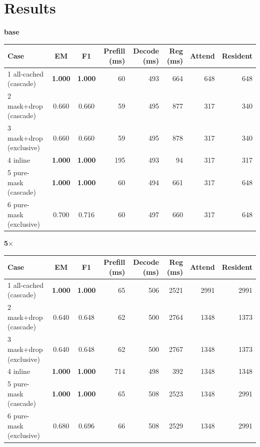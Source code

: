 \documentclass[11pt]{article}
\begin{document}
\section{Results}
\begin{table}[h]
\centering
\renewcommand{\arraystretch}{1.12}
\setlength{\tabcolsep}{5pt}
\textbf{base}\\[2pt]
\begin{tabular}{@{}l c c r r r r r@{}}
\toprule
Case & EM & F1 & Prefill (ms) & Decode (ms) & Reg (ms) & Attend & Resident \\
\midrule
1 all-cached (cascade)  & \textbf{1.000} & \textbf{1.000} & 60  & 493 & 664 & 648 & 648 \\
2 mask+drop (cascade)   & 0.660 & 0.660 & 59  & 495 & 877 & 317 & 340 \\
3 mask+drop (exclusive) & 0.660 & 0.660 & 59  & 495 & 878 & 317 & 340 \\
4 inline                & \textbf{1.000} & \textbf{1.000} & 195 & 493 & 94  & 317 & 317 \\
5 pure-mask (cascade)   & \textbf{1.000} & \textbf{1.000} & 60  & 494 & 661 & 317 & 648 \\
6 pure-mask (exclusive) & 0.700 & 0.716 & 60  & 497 & 660 & 317 & 648 \\
\bottomrule
\end{tabular}

\vspace{0.8em}
\textbf{5$\times$}\\[2pt]
\begin{tabular}{@{}l c c r r r r r@{}}
\toprule
Case & EM & F1 & Prefill (ms) & Decode (ms) & Reg (ms) & Attend & Resident \\
\midrule
1 all-cached (cascade)  & \textbf{1.000} & \textbf{1.000} & 65  & 506 & 2521 & 2991 & 2991 \\
2 mask+drop (cascade)   & 0.640 & 0.648 & 62  & 500 & 2764 & 1348 & 1373 \\
3 mask+drop (exclusive) & 0.640 & 0.648 & 62  & 500 & 2767 & 1348 & 1373 \\
4 inline                & \textbf{1.000} & \textbf{1.000} & 714 & 498 & 392  & 1348 & 1348 \\
5 pure-mask (cascade)   & \textbf{1.000} & \textbf{1.000} & 65  & 508 & 2523 & 1348 & 2991 \\
6 pure-mask (exclusive) & 0.680 & 0.696 & 66  & 508 & 2529 & 1348 & 2991 \\
\bottomrule
\end{tabular}


\end{table}
\end{document}
